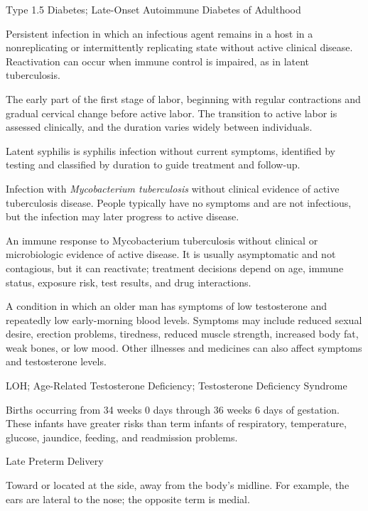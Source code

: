 \synonyms
Type 1.5 Diabetes; Late-Onset Autoimmune Diabetes of Adulthood

 Persistent infection in which an infectious agent remains in a host in a nonreplicating
or intermittently replicating state without active clinical disease. Reactivation can
occur when immune control is impaired, as in latent tuberculosis.

 The early part of the first stage of labor, beginning with regular contractions and gradual
cervical change before active labor. The transition to active labor is assessed clinically,
and the duration varies widely between individuals.

 Latent syphilis is syphilis infection without current symptoms, identified by testing and classified by duration to guide treatment and follow-up.

 Infection with \textit{Mycobacterium tuberculosis} without clinical evidence of active tuberculosis disease. People typically have no symptoms and are not infectious, but the infection may later progress to active disease.

 An immune response to Mycobacterium tuberculosis without clinical or microbiologic evidence of active
disease. It is usually asymptomatic and not contagious, but it can reactivate; treatment
decisions depend on age, immune status, exposure risk, test results, and drug interactions.

 A condition in which an older man has symptoms of low testosterone and repeatedly low early-morning blood levels. Symptoms may include reduced sexual desire, erection problems, tiredness, reduced muscle strength, increased body fat, weak bones, or low mood. Other illnesses and medicines can also affect symptoms and testosterone levels.

\synonyms
LOH; Age-Related Testosterone Deficiency; Testosterone Deficiency Syndrome

 Births occurring from 34 weeks 0 days through 36 weeks 6 days of gestation. These infants have
greater risks than term infants of respiratory, temperature, glucose, jaundice, feeding,
and readmission problems.

\synonyms
Late Preterm Delivery

 Toward or located at the side, away from the body’s midline. For example, the ears are lateral to the nose; the opposite term is medial.

